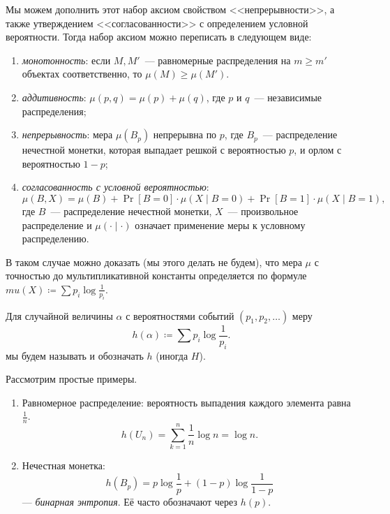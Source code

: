 Мы можем дополнить этот набор аксиом свойством <<непрерывности>>, а также утверждением
<<согласованности>> с определением условной вероятности. Тогда набор аксиом можно переписать в следующем
виде:
\begin{enumerate}
    \item \textit{монотонность}: если $M, M'$~--- равномерные распределения на $m \geq m'$ объектах
        соответственно, то $\mu(M) \geq \mu(M')$.
    \item \textit{аддитивность}: $\mu(p, q) = \mu(p) + \mu(q)$, где $p$ и $q$~--- независимые
        распределения;
    \item \textit{непрерывность}: мера $\mu(B_p)$ непрерывна по $p$, где $B_p$~--- распределение
        нечестной монетки, которая выпадает решкой с вероятностью $p$, и орлом с вероятностью $1 - p$;
    \item \textit{согласованность с условной вероятностью}:
        $$
            \mu(B, X) = \mu(B) + \Pr[B = 0] \cdot \mu(X \mid B = 0) + \Pr[B = 1] \cdot \mu(X \mid B = 1),
        $$
        где $B$~--- распределение нечестной монетки, $X$~--- произвольное распределение и $\mu(\cdot
        \mid \cdot)$ означает применение меры к условному распределению.
\end{enumerate}

В таком случае можно доказать (мы этого делать не будем), что мера $\mu$ с точностью до мультипликативной
константы определяется по формуле $mu(X) \coloneqq \sum p_i \log \frac{1}{p_i}$.

\begin{definition}
    Для случайной величины $\alpha$ с вероятностями событий $(p_1, p_2, \dots)$ меру
    $$
        h(\alpha) \coloneqq \sum p_i \log \frac{1}{p_i}.
    $$
    мы будем называть  и обозначать $h$ (иногда $H$).
\end{definition}

Рассмотрим простые примеры.

\begin{enumerate}
    \item Равномерное распределение: вероятность выпадения каждого элемента равна $\frac{1}{n}$.
        $$
            h(U_n) = \sum_{k = 1}^n \frac{1}{n} \log n = \log n.
        $$
    \item Нечестная монетка:
        $$
        h(B_p) = p \log \frac{1}{p} + (1 - p) \log \frac{1}{1 - p}
        $$
        --- \textit{бинарная энтропия}. Её часто обозначают через $h(p)$.
\end{enumerate}


